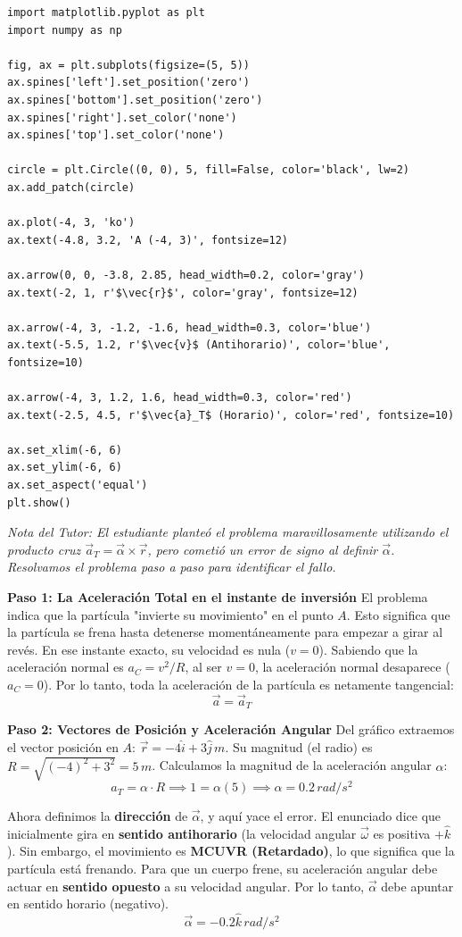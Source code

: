 \documentclass[12pt, a4paper]{article}
\begin{document}
\begin{verbatim}
import matplotlib.pyplot as plt
import numpy as np

fig, ax = plt.subplots(figsize=(5, 5))
ax.spines['left'].set_position('zero')
ax.spines['bottom'].set_position('zero')
ax.spines['right'].set_color('none')
ax.spines['top'].set_color('none')

circle = plt.Circle((0, 0), 5, fill=False, color='black', lw=2)
ax.add_patch(circle)

ax.plot(-4, 3, 'ko')
ax.text(-4.8, 3.2, 'A (-4, 3)', fontsize=12)

ax.arrow(0, 0, -3.8, 2.85, head_width=0.2, color='gray')
ax.text(-2, 1, r'$\vec{r}$', color='gray', fontsize=12)

ax.arrow(-4, 3, -1.2, -1.6, head_width=0.3, color='blue')
ax.text(-5.5, 1.2, r'$\vec{v}$ (Antihorario)', color='blue', fontsize=10)

ax.arrow(-4, 3, 1.2, 1.6, head_width=0.3, color='red')
ax.text(-2.5, 4.5, r'$\vec{a}_T$ (Horario)', color='red', fontsize=10)

ax.set_xlim(-6, 6)
ax.set_ylim(-6, 6)
ax.set_aspect('equal')
plt.show()
\end{verbatim}

\textit{Nota del Tutor: El estudiante planteó el problema maravillosamente utilizando el producto cruz $\vec{a}_T = \vec{\alpha} \times \vec{r}$, pero cometió un error de signo al definir $\vec{\alpha}$. Resolvamos el problema paso a paso para identificar el fallo.}

\textbf{Paso 1: La Aceleración Total en el instante de inversión}
El problema indica que la partícula "invierte su movimiento" en el punto $A$. Esto significa que la partícula se frena hasta detenerse momentáneamente para empezar a girar al revés. En ese instante exacto, su velocidad es nula ($v = 0$).
Sabiendo que la aceleración normal es $a_C = v^2/R$, al ser $v=0$, la aceleración normal desaparece ($a_C = 0$). Por lo tanto, toda la aceleración de la partícula es netamente tangencial:
$$ \vec{a} = \vec{a}_T $$

\textbf{Paso 2: Vectores de Posición y Aceleración Angular}
Del gráfico extraemos el vector posición en $A$: $\vec{r} = -4\hat{i} + 3\hat{j} \,\si{m}$.
Su magnitud (el radio) es $R = \sqrt{(-4)^2 + 3^2} = 5\,\si{m}$.
Calculamos la magnitud de la aceleración angular $\alpha$:
$$ a_T = \alpha \cdot R \implies 1 = \alpha (5) \implies \alpha = 0.2\,\si{rad/s^2} $$

Ahora definimos la \textbf{dirección} de $\vec{\alpha}$, y aquí yace el error. 
El enunciado dice que inicialmente gira en \textbf{sentido antihorario} (la velocidad angular $\vec{\omega}$ es positiva $+\hat{k}$). 
Sin embargo, el movimiento es \textbf{MCUVR (Retardado)}, lo que significa que la partícula está frenando. Para que un cuerpo frene, su aceleración angular debe actuar en \textbf{sentido opuesto} a su velocidad angular. 
Por lo tanto, $\vec{\alpha}$ debe apuntar en sentido horario (negativo).
$$ \vec{\alpha} = -0.2\hat{k} \,\si{rad/s^2} $$
\end{document}
